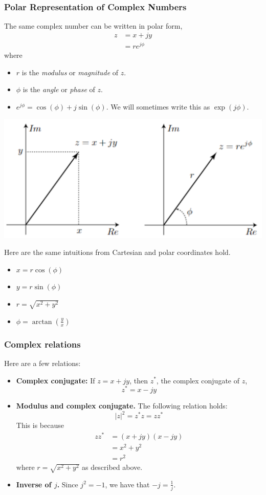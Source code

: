 \documentclass[10pt]{article}
\begin{document}
\subsubsection*{Polar Representation of Complex Numbers}
The same complex number can be written in polar form,
\begin{align*}
    z &= x + jy\\
    &= re^{j \phi}
\end{align*}
where 
\begin{itemize}
    \item $r$ is the \textit{modulus} or \textit{magnitude} of $z$.
    \item $\phi$ is the \textit{angle} or \textit{phase} of $z$.
    \item $e^{j\phi} = \cos(\phi) + j\sin(\phi)$.  We will sometimes write this as $\exp(j\phi)$.
\end{itemize}
\begin{center}
    \includegraphics[scale=0.6]{W1_5.png}
\end{center}
Here are the same intuitions from Cartesian and polar coordinates hold.
\begin{itemize}
    \item $x = r \cos(\phi)$
    \item $y = r\sin(\phi)$
    \item $r = \sqrt{x^2 + y^2}$
    \item $\phi = \arctan\left(\frac{y}{x}\right)$
\end{itemize}
\subsubsection*{Complex relations}
Here are a few relations:
\begin{itemize}
    \item \textbf{Complex conjugate:} If $z = x + jy$, then $z^*$, the complex conjugate of $z$,
    \[z^* = x - jy\]
    \item \textbf{Modulus and complex conjugate.}  The following relation holds:
    \[\vert z \vert^2 = z^*z = zz^*\]
    This is because
    \begin{align*}
        zz^* &= (x + jy)(x - jy) \\
        &= x^2 + y^2\\
        &= r^2
    \end{align*}
    where $r = \sqrt{x^2 + y^2}$ as described above.
    \item \textbf{Inverse of $j$.}  Since $j^2 = -1$, we have that $-j = \frac{1}{j}$.
\end{itemize}
\end{document}
